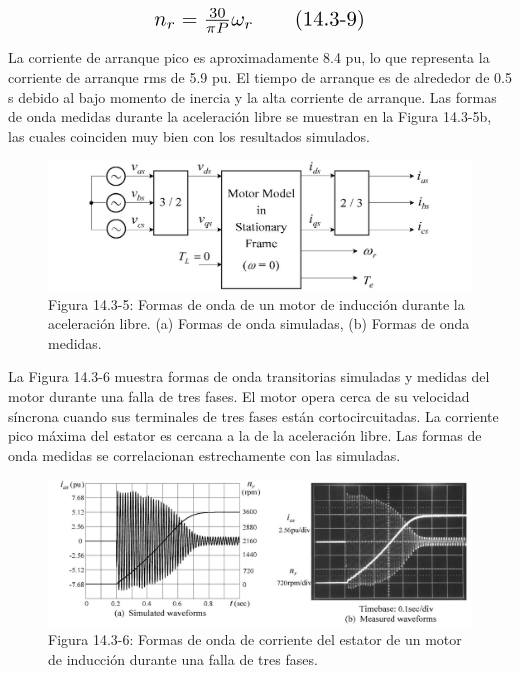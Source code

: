\documentclass[letterpaper,12pt]{article} %
\begin{document}
\[
    \scalebox{1.5}{$n_r = \frac{30}{\pi P} \omega_r \tag{14.3-9}$}
\]

La corriente de arranque pico es aproximadamente 8.4 pu, lo que representa la corriente de arranque rms de 5.9 pu. El tiempo de arranque es de alrededor de 0.5 s debido al bajo momento de inercia y la alta corriente de arranque. Las formas de onda medidas durante la aceleración libre se muestran en la Figura 14.3-5b, las cuales coinciden muy bien con los resultados simulados.

\begin{figure}[ht]
    \centering
    \includegraphics{graficos/img06.jpg} 
    \caption{Figura 14.3-5: Formas de onda de un motor de inducción durante la aceleración libre. (a) Formas de onda simuladas, (b) Formas de onda medidas.}
    \label{fig:14.3-5}
\end{figure}
\FloatBarrier  

La Figura 14.3-6 muestra formas de onda transitorias simuladas y medidas del motor durante una falla de tres fases. El motor opera cerca de su velocidad síncrona cuando sus terminales de tres fases están cortocircuitadas. La corriente pico máxima del estator es cercana a la de la aceleración libre. Las formas de onda medidas se correlacionan estrechamente con las simuladas.

\begin{figure}[ht]
    \centering
    \includegraphics{graficos/img07.jpg} 
    \caption{Figura 14.3-6: Formas de onda de corriente del estator de un motor de inducción durante una falla de tres fases.}
    \label{fig:14.3-6}
\end{figure}
\FloatBarrier
\end{document}
